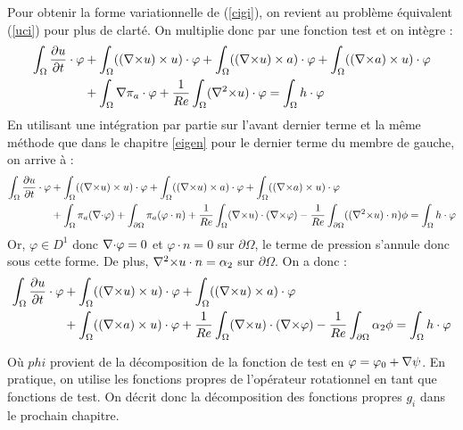Pour obtenir la forme variationnelle de (\ref{cigi}), on revient au problème équivalent (\ref{uci}) pour plus de clarté. On multiplie donc par une fonction test et on intègre :
\begin{align*}
\int_\Omega \frac{\partial u}{\partial t}\cdot \varphi &+ \int_\Omega (({\nabla\times} u)\times u)\cdot \varphi + \int_\Omega (({\nabla\times} u)\times a)\cdot\varphi + \int_\Omega (({\nabla\times} a)\times u)\cdot\varphi \\
&+ \int_\Omega {\nabla}\pi_a\cdot\varphi + \frac{1}{Re}\int_\Omega ({\nabla^2\times} u)\cdot\varphi = \int_\Omega h\cdot\varphi
\end{align*}
En utilisant une intégration par partie sur l'avant dernier terme et la même méthode que dans le chapitre \ref{eigen} pour le dernier terme du membre de gauche, on arrive à :
\begin{align*}
\int_\Omega \frac{\partial u}{\partial t}\cdot \varphi &+ \int_\Omega (({\nabla\times} u)\times u)\cdot \varphi + \int_\Omega (({\nabla\times} u)\times a)\cdot\varphi + \int_\Omega (({\nabla\times} a)\times u)\cdot\varphi\\ 
&+ \int_\Omega \pi_a({\nabla\cdot}\varphi) + \int_{\partial \Omega} \pi_a(\varphi\cdot n) + \frac{1}{Re}\int_\Omega ({\nabla\times} u)\cdot({\nabla\times}\varphi) -\frac{1}{Re}\int_{\partial\Omega} (({\nabla^2\times} u)\cdot n)\phi = \int_\Omega h\cdot\varphi
\end{align*}
Or, $\varphi\in D^1$ donc ${\nabla\cdot}\varphi=0$ et $\varphi\cdot n=0$ sur $\partial\Omega$, le terme de pression s'annule donc sous cette forme. De plus, ${\nabla^2\times} u\cdot n=\alpha_2$ sur $\partial\Omega$. On a donc :
\begin{eqnarray}
\label{fvu}
\begin{aligned}
\int_\Omega \frac{\partial u}{\partial t}\cdot \varphi &+ \int_\Omega (({\nabla\times} u)\times u)\cdot \varphi + \int_\Omega (({\nabla\times} u)\times a)\cdot\varphi \\
&+ \int_\Omega (({\nabla\times} a)\times u)\cdot\varphi + \frac{1}{Re}\int_\Omega ({\nabla\times} u)\cdot({\nabla\times}\varphi) -\frac{1}{Re}\int_{\partial\Omega} \alpha_2\phi = \int_\Omega h\cdot\varphi
\end{aligned}
\end{eqnarray}

Où $phi$ provient de la décomposition de la fonction de test en $\varphi=\varphi_0+{\nabla}\psi$. En pratique, on utilise les fonctions propres de l'opérateur rotationnel en tant que fonctions de test.
On décrit donc la décomposition des fonctions propres $g_i$ dans le prochain chapitre.

